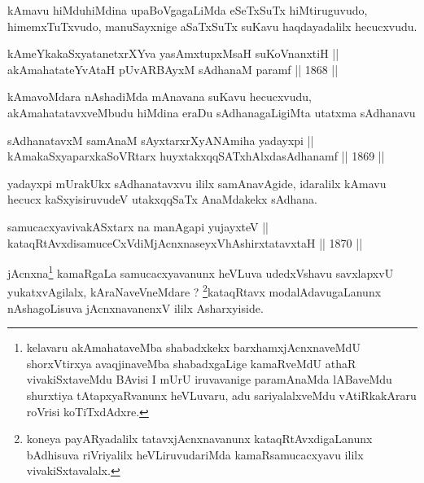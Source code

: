 \begin{artha}
kAmavu hiMduhiMdina upaBoVgagaLiMda eSeTxSuTx hiMtiruguvudo,
himemxTuTxvudo, manuSayxnige aSaTxSuTx suKavu haqdayadalilx
hecucxvudu.
\end{artha}

\begin{shl}
kAmeYkakaSxyatanetxrXYva yasAmxtupxMsaH suKoVnanxtiH || \\
akAmahatateYvAtaH pUvARBAyxM sAdhanaM paramf ||  1868 ||  
\end{shl}

\begin{artha}
kAmavoMdara nAshadiMda mAnavana suKavu hecucxvudu,
akAmahatatavxveMbudu hiMdina eraDu sAdhanagaLigiMta utatxma sAdhanavu 
\end{artha}


\begin{shl}
sAdhanatavxM samAnaM sAyxtarxrXyANAmiha yadayxpi || \\
kAmakaSxyaparxkaSoVR\s tarx huyxtakxqqSATxhAlxdasAdhanamf ||  1869 ||  
\end{shl}

\begin{artha}
yadayxpi mUrakUkx sAdhanatavxvu ililx samAnavAgide, idaralilx kAmavu
hecucx kaSxyisiruvudeV utakxqqSaTx AnaMdakekx sAdhana.
\end{artha}

\begin{shl}
samucacxyavivakASx\s tarx na manAgapi yujayxteV || \\
kataqRtAvxdisamuceCxVdiMjAcnxnaseyxVhA\s \s shirxtatavxtaH ||  1870 ||  
\end{shl}

\begin{artha}
jAcnxna\footnote[1]{kelavaru akAmahataveMba shabadxkekx
barxhamxjAcnxnaveMdU shorxVtirxya avaqjinaveMba shabadxgaLige
kamaRveMdU athaR vivakiSxtaveMdu BAvisi I mUrU iruvavanige
paramAnaMda lABaveMdu shurxtiya tAtapxyaRvanunx heVLuvaru, adu
sariyalalxveMdu vAtiRkakAraru roVrisi koTiTxdAdxre.} kamaRgaLa samucacxyavanunx heVLuva udedxVshavu savxlapxvU
yukatxvAgilalx, kAraNaveVneMdare ? \footnote[2]{koneya payARyadalilx
tatavxjAcnxnavanunx kataqRtAvxdigaLanunx bAdhisuva riVriyalilx
heVLiruvudariMda kamaRsamucacxyavu ililx vivakiSxtavalalx.}kataqRtavx
modalAdavugaLanunx nAshagoLisuva jAcnxnavanenxV ililx Asharxyiside.
\end{artha}

